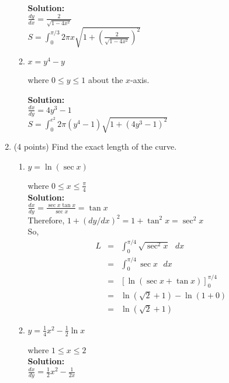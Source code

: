 \documentclass[paper=a4, fontsize=11pt]{scrartcl} %
\numberwithin{equation}{section} %
\numberwithin{figure}{section} %
\numberwithin{table}{section} %
\begin{document}
\begin{enumerate}
\begin{enumerate}
\noindent\textbf{Solution:}\\
$\frac{dy}{dx}=\frac{2}{\sqrt{1-4x^2}}$ \\
$S=\int_0^{\pi/3} 2 \pi x \sqrt{1+\left(\frac{2}{\sqrt{1-4x^2}}\right)^2}$
\vspace{.5in}
\item \begin{large}$x=y^4-y$\end{large} where $0 \le y \le 1$ about the $x$-axis.

\noindent\textbf{Solution:}\\
$\frac{dx}{dy}=4y^3-1$ \\
$S=\int_0^{e^2} 2 \pi (y^4-1) \sqrt{1+\left(4y^3-1\right)^2}$

\end{enumerate}

\newpage
\item (4 points) Find the exact length of the curve.
\begin{enumerate}
\item \begin{large}$y=\ln (\sec x)$\end{large} where $0 \le x \le \frac{\pi}{4}$\\

\noindent\textbf{Solution:}\\
$\frac{dx}{dy}=\frac{\sec x \tan x}{\sec x} = \tan x$\\

Therefore, $1+(dy/dx)^2 = 1 + \tan^2 x = \sec ^2 x$ \\

So, 
\begin{eqnarray*}
L &=& \int_0^{\pi/4} \sqrt{ \sec ^2 x} \text{ } dx \\
&=& \int_0^{\pi/4} \sec x \text{ } dx  \\
&=& \left[ \ln (\sec x + \tan x) \right]_0^{\pi/4}  \\
&=& \ln (\sqrt{2} + 1)- \ln (1+0)  \\
&=& \ln (\sqrt{2} + 1)
\end{eqnarray*}

\vspace{.25in}
\item \begin{large}$y=\frac{1}{4}x^2-\frac{1}{2} \ln x$\end{large} where $1 \le x \le 2$\\

\noindent\textbf{Solution:}\\
$\frac{dx}{dy}=\frac{1}{2}x^2-\frac{1}{2x}$ \\


\end{enumerate}
\end{enumerate}
\end{document}
